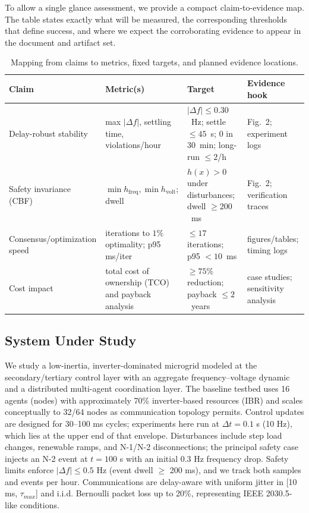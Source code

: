 \documentclass[12pt]{article}
\begin{document}
To allow a single glance assessment, we provide a compact claim-to-evidence map. The table states exactly what will be measured, the corresponding thresholds that define success, and where we expect the corroborating evidence to appear in the document and artifact set.

\begin{table}[t]
\centering
\small
\begin{tabular}{|p{2.9cm}|p{4.1cm}|p{3.2cm}|p{3.0cm}|}
\hline
\textbf{Claim} & \textbf{Metric(s)} & \textbf{Target} & \textbf{Evidence hook} \\
\hline
Delay-robust stability & max $|\Delta f|$, settling time, violations/hour & $|\Delta f| \leq 0.30$~Hz; settle $\leq 45$~s; $0$ in 30~min; long-run $\leq 2$/h & Fig.~2; experiment logs \\
\hline
Safety invariance (CBF) & $\min h_{\mathrm{freq}}, \min h_{\mathrm{volt}}$; dwell & $h(x)>0$ under disturbances; dwell $\ge 200$~ms & Fig.~2; verification traces \\
\hline
Consensus/\newline optimization speed & iterations to $1\%$ optimality; p95 ms/iter & $\le 17$ iterations; p95 $<10$~ms & figures/tables; timing logs \\
\hline
Cost impact & total cost of ownership (TCO) and payback analysis & $\ge 75\%$ reduction; payback $\le 2$~years & case studies; sensitivity analysis \\
\hline
\end{tabular}
\caption{Mapping from claims to metrics, fixed targets, and planned evidence locations.}
\label{tab:claims}
\end{table}

\vspace{-0.5cm}
\subsection{System Under Study}
\vspace{-0.2cm}
We study a low-inertia, inverter-dominated microgrid modeled at the secondary/tertiary control layer with an aggregate frequency--voltage dynamic and a distributed multi-agent coordination layer. The baseline testbed uses 16 agents (nodes) with approximately 70\% inverter-based resources (IBR) and scales conceptually to 32/64 nodes as communication topology permits. Control updates are designed for 30--100 ms cycles; experiments here run at $\Delta t = 0.1$ s (10 Hz), which lies at the upper end of that envelope. Disturbances include step load changes, renewable ramps, and N-1/N-2 disconnections; the principal safety case injects an N-2 event at $t = 100$ s with an initial 0.3 Hz frequency drop. Safety limits enforce $|\Delta f| \leq 0.5$ Hz (event dwell $\geq$ 200 ms), and we track both samples and events per hour. Communications are delay-aware with uniform jitter in [10 ms, $\tau_{max}$] and i.i.d. Bernoulli packet loss up to 20\%, representing IEEE 2030.5-like conditions.
\end{document}
